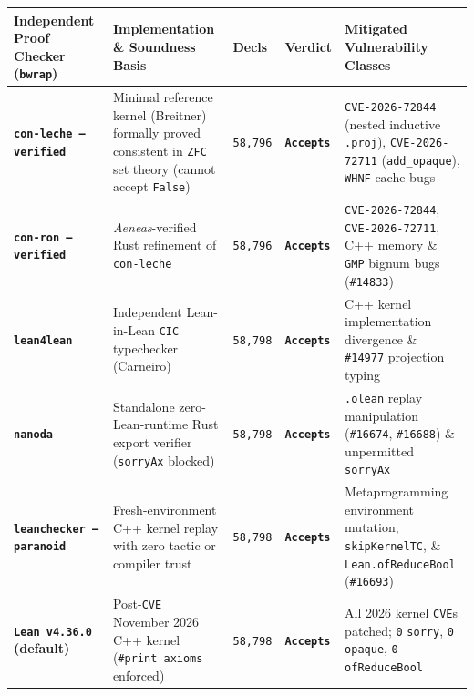 \documentclass[10pt,letterpaper]{article}
\newcounter{none}
\begin{document}
{\def\LTcaptype{none} %
{\footnotesize\setlength{\tabcolsep}{3.8pt}\renewcommand{\arraystretch}{1.15}
\begin{longtable}[]{@{}
  >{\raggedright\arraybackslash}p{}
  >{\raggedright\arraybackslash}p{}
  >{\centering\arraybackslash}p{}
  >{\centering\arraybackslash}p{}
  >{\raggedright\arraybackslash}p{}@{}}
\toprule\noalign{}
\textbf{Independent Proof Checker (\texttt{bwrap})} &
\textbf{Implementation \& Soundness Basis} &
\textbf{Decls} &
\textbf{Verdict} &
\textbf{Mitigated Vulnerability Classes} \\
\midrule\noalign{}
\endhead
\bottomrule\noalign{}
\endlastfoot
\textbf{\texttt{con-leche\ --verified}} & Minimal reference kernel
(Breitner) formally proved consistent in \texttt{ZFC} set theory (cannot
accept \texttt{False}) & \texttt{58,796} & \textbf{\texttt{Accepts}} &
\texttt{CVE-2026-72844} (nested inductive \texttt{.proj}),
\texttt{CVE-2026-72711} (\texttt{add\_opaque}), \texttt{WHNF} cache bugs \\
\textbf{\texttt{con-ron\ --verified}} & \emph{Aeneas}-verified Rust
refinement of \texttt{con-leche} & \texttt{58,796} &
\textbf{\texttt{Accepts}} & \texttt{CVE-2026-72844},
\texttt{CVE-2026-72711}, C++ memory \& \texttt{GMP} bignum bugs
(\texttt{\#14833}) \\
\textbf{\texttt{lean4lean}} & Independent Lean-in-Lean \texttt{CIC}
typechecker (Carneiro) & \texttt{58,798} & \textbf{\texttt{Accepts}} &
C++ kernel implementation divergence \& \texttt{\#14977} projection typing \\
\textbf{\texttt{nanoda}} & Standalone zero-Lean-runtime Rust export
verifier (\texttt{sorryAx} blocked) & \texttt{58,798} &
\textbf{\texttt{Accepts}} & \texttt{.olean} replay manipulation
(\texttt{\#16674}, \texttt{\#16688}) \& unpermitted \texttt{sorryAx} \\
\textbf{\texttt{leanchecker\ --paranoid}} & Fresh-environment C++ kernel
replay with zero tactic or compiler trust & \texttt{58,798} &
\textbf{\texttt{Accepts}} & Metaprogramming environment mutation,
\texttt{skipKernelTC}, \& \texttt{Lean.\allowbreak{}ofReduceBool} (\texttt{\#16693}) \\
\textbf{\texttt{Lean\ v4.36.0} (default)} & Post-\texttt{CVE} November
2026 C++ kernel (\texttt{\#print\ axioms} enforced) & \texttt{58,798} &
\textbf{\texttt{Accepts}} & All 2026 kernel \texttt{CVE}s patched;
\texttt{0} \texttt{sorry}, \texttt{0} \texttt{opaque}, \texttt{0} \texttt{ofReduceBool} \\
\end{longtable}
}
}
\end{document}
